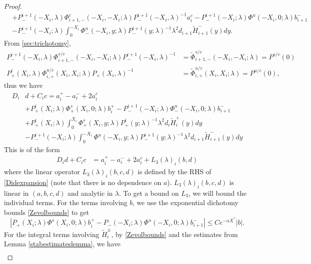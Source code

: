 \documentclass[thesis.tex]{subfiles}
\begin{document}
\begin{lemma}
\begin{proof}
\begin{equation}
\begin{aligned}
&+ P^{i+1}_-(-X_i, \lambda) \Phi^c_{i+1,-}(-X_i,-X_i; \lambda) P^{i+1}_-(-X_i, \lambda)^{-1} a_i^c - P^{i+1}_-(-X_i; \lambda)\Phi^u(-X_i, 0; \lambda) b_{i+1}^- \\
&- P^{i+1}_-(-X_i; \lambda) \int_0^{-X_i} \Phi^u_-(-X_i, y; \lambda) P^{i+1}_-(y; \lambda)^{-1} \lambda^2 d_{i+1} \tilde{H}_{i+1}^-(y) dy.
\end{aligned}
\end{equation}
From \cref{sec:trichotomy}, 
\begin{align*}
P^{i+1}_-(-X_i, \lambda) \Phi^{s/c}_{i+1,-}(-X_i, -X_i; \lambda) P^{i+1}_-(-X_i, \lambda)^{-1} &= \tilde{\Phi}^{s/c}_{i+1,-}(-X_i, -X_i; \lambda) = P^{s/c}(0) \\
P^i_+(X_i, \lambda) \Phi^{u/c}_{i,+}(X_i, X_i; \lambda) P_+(X_i, \lambda)^{-1} &= \tilde{\Phi}^{u/c}_{i,+}(X_i, X_i; \lambda) = P^{u/c}(0),
\end{align*}
thus we have
\begin{equation}\label{Didexpansion}
\begin{aligned}
D_i &d + C_i c = a_i^+ - a_i^- + 2 a_i^c \\
&+ P^i_+(X_i; \lambda)\Phi^s_+(X_i, 0; \lambda) b_i^+ - P^{i+1}_-(-X_i; \lambda)\Phi^u_-(-X_i, 0; \lambda) b_{i+1}^- \\
&+ P^i_+(X_i; \lambda) \int_0^{X_i} \Phi^s_+(X_i, y; \lambda) P^i_+(y; \lambda)^{-1} \lambda^2 d_i \tilde{H}_i^+(y) dy \\ 
&- P^{i+1}_-(-X_i; \lambda) \int_0^{-X_i} \Phi^u(-X_i, y; \lambda) P^{i+1}_-(y; \lambda)^{-1} \lambda^2 d_{i+1} \tilde{H}_{i+1}^-(y) dy
\end{aligned}
\end{equation}
This is of the form
\begin{align}\label{Dideq1}
D_i d + C_i c &= a_i^+ - a_i^- + 2 a_i^c + L_3(\lambda)_i(b, d)
\end{align}
where the linear operator $L_3(\lambda)_i(b, c, d)$ is defined by the RHS of \cref{Didexpansion} (note that there is no dependence on $a$). $L_3(\lambda)_i(b, c, d)$ is linear in $(a,b,c,d)$ and analytic in $\lambda$. To get a bound on $L_3$, we will bound the individual terms. For the terms involving $b$, we use the exponential dichotomy bounds \eqref{Zevolbounds} to get
\[
| P_+(X_i; \lambda)\Phi^s(X_i, 0; \lambda) b_i^+ - P_-(-X_i; \lambda) \Phi^u(-X_i, 0; \lambda) b_{i+1}^-| \leq C e^{-\alpha X^*} |b|.
\]
For the integral terms involving $\tilde{H}_i^\pm$, by \eqref{Zevolbounds} and the estimates from Lemma \ref{stabestimateslemma}, we have
\begin{align*}

\end{align*}
\end{proof}
\end{lemma}
\end{document}
